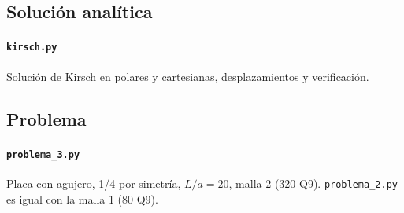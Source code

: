 \subsection*{Soluci\'on anal\'itica}

\paragraph{\texttt{kirsch.py}} Soluci\'on de Kirsch en polares y cartesianas, desplazamientos y verificaci\'on.


\subsection*{Problema}

\paragraph{\texttt{problema\_3.py}} Placa con agujero, 1/4 por simetr\'ia, $L/a=20$, malla 2 (320 Q9). \texttt{problema\_2.py} es igual con la malla 1 (80 Q9).

